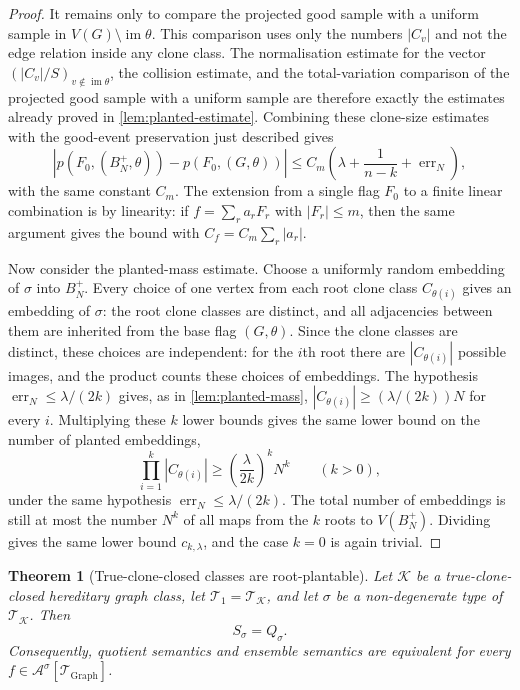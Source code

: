 \documentclass[11pt]{article}
\newtheorem{theorem}{Theorem}
\theoremstyle{definition}
\newcommand{\A}{\mathcal{A}}
\newcommand{\K}{\mathcal{K}}
\newcommand{\T}{\mathcal{T}}
\begin{document}
\begin{proof}
It remains only to compare the projected good sample with a uniform sample in
$V(G)\setminus\operatorname{im}\theta$.  This comparison uses only the numbers
$|C_v|$ and not the edge relation inside any clone class.  The normalisation
estimate for the vector $(|C_v|/S)_{v\notin\operatorname{im}\theta}$, the
collision estimate, and the total-variation comparison of the projected good
sample with a uniform sample are therefore exactly the estimates already proved
in \cref{lem:planted-estimate}.  Combining these clone-size estimates with the
good-event preservation just described gives
\[
  \left|p(F_0,(B_N^+,\widehat\theta))-p(F_0,(G,\theta))\right|
  \le
  C_m\left(\lambda+\frac1{n-k}+\operatorname{err}_N\right),
\]
with the same constant $C_m$.  The extension from a single flag $F_0$ to a
finite linear combination is by linearity: if $f=\sum_r a_rF_r$ with
$|F_r|\le m$, then the same argument gives the bound with
$C_f=C_m\sum_r|a_r|$.

Now consider the planted-mass estimate.  Choose a uniformly random embedding of
$\sigma$ into $B_N^+$.  Every choice of one vertex from each root clone class
$C_{\theta(i)}$ gives an embedding of $\sigma$: the root clone classes are
distinct, and all adjacencies between them are inherited from the base flag
$(G,\theta)$.  Since the clone classes are distinct, these choices are independent:
for the $i$th root there are $|C_{\theta(i)}|$ possible images, and the product counts
these choices of embeddings.  The
hypothesis $\operatorname{err}_N\le\lambda/(2k)$ gives, as in
\cref{lem:planted-mass},
$|C_{\theta(i)}|\ge(\lambda/(2k))N$ for every $i$.  Multiplying these $k$
lower bounds gives the same lower bound on the number of planted embeddings,
\[
  \prod_{i=1}^k |C_{\theta(i)}|
  \ge
  \left(\frac{\lambda}{2k}\right)^k N^k
  \qquad(k>0),
\]
under the same hypothesis $\operatorname{err}_N\le\lambda/(2k)$.  The total
number of embeddings is still at most the number $N^k$ of all maps from the
$k$ roots to $V(B_N^+)$.  Dividing gives the
same lower bound $c_{k,\lambda}$, and the case $k=0$ is again trivial.
\end{proof}

\begin{theorem}[True-clone-closed classes are root-plantable]\label{thm:true-clone-root-plantable}
Let $\K$ be a true-clone-closed hereditary graph class, let
$\T_1=\T_\K$, and let $\sigma$ be a non-degenerate type of $\T_\K$.  Then
\[
  S_\sigma=Q_\sigma.
\]
Consequently, quotient semantics and ensemble semantics are equivalent for every
$f\in\A^\sigma[\T_{\mathrm{Graph}}]$.
\end{theorem}
\end{document}

